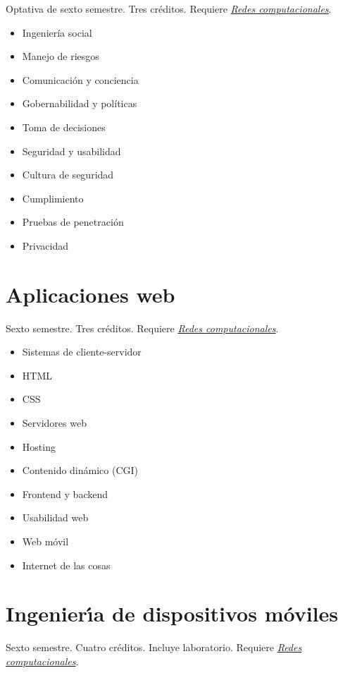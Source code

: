 \documentclass{article}
\begin{document}
\begin{multicols}{4}
Optativa de sexto semestre. Tres cr\'{e}ditos. Requiere
\hyperlink{rc}{\em Redes computacionales}.

\begin{itemize}
\item{Ingenier\'{i}a social}
\item{Manejo de riesgos}
\item{Comunicaci\'{o}n y conciencia}
\item{Gobernabilidad y pol\'{i}ticas}
\item{Toma de decisiones}
\item{Seguridad y usabilidad}
\item{Cultura de seguridad}
\item{Cumplimiento}
\item{Pruebas de penetraci\'{o}n}
\item{Privacidad}
\end{itemize}

\vfill\null \columnbreak

\hypertarget{aw}{\section*{Aplicaciones web}}  

Sexto semestre. Tres cr\'{e}ditos. Requiere
\hyperlink{rc}{\em Redes computacionales}.

\begin{itemize}
\item{Sistemas de cliente-servidor}
\item{HTML}
\item{CSS}
\item{Servidores web}
\item{Hosting}
\item{Contenido din\'{a}mico (CGI)}  
\item{Frontend y backend}
\item{Usabilidad web}
\item{Web m\'{o}vil}
\item{Internet de las cosas}  
\end{itemize}

\vfill\null \columnbreak

\hypertarget{iddm}{\section*{Ingenier\'{\i}a de dispositivos m\'{o}viles}} 

Sexto semestre. Cuatro cr\'{e}ditos. Incluye laboratorio. Requiere
\hyperlink{rc}{\em Redes computacionales}.


\end{multicols}
\end{document}
